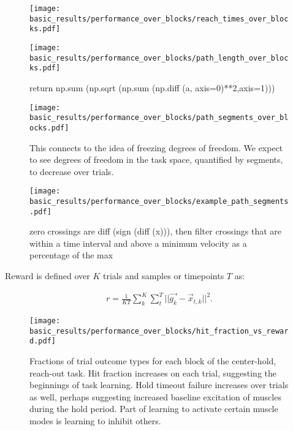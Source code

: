 \documentclass[../main.tex]{subfiles}
\begin{document}
\begin{figure}[H]
    \centering
    \texttt{[image: basic\_results/performance\_over\_blocks/reach\_times\_over\_blocks.pdf]}
    \caption[Reach time over trials]{}\label{fig:reach_times_over_blocks}
\end{figure}


\begin{figure}[H]
    \centering
    \texttt{[image: basic\_results/performance\_over\_blocks/path\_length\_over\_blocks.pdf]}
    \caption[Trajectory length over trials]{return np.sum (np.sqrt (np.sum (np.diff (a, axis=0)**2,axis=1)))}\label{fig:path_length_over_blocks}
\end{figure}


\begin{figure}[H]
    \centering
    \texttt{[image: basic\_results/performance\_over\_blocks/path\_segments\_over\_blocks.pdf]}
    \caption[Trajectory segments over trials]{This connects to the idea of freezing degrees of freedom. We expect to see degrees of freedom in the task space, quantified by segments, to decrease over trials.}\label{fig:path_segments_over_blocks}
\end{figure}


\begin{figure}[H]
    \centering
    \texttt{[image: basic\_results/performance\_over\_blocks/example\_path\_segments.pdf]}
    \caption[Trajectory segment definition]{zero crossings are diff (sign (diff (x))), then filter crossings that are within a time interval and above a minimum velocity as a percentage of the max}\label{fig:segments}
\end{figure}


Reward is defined over $K$ trials and samples or timepoints $T$ as:

\begin{align}
    r = \frac{1}{KT}\sum_k^K\sum_t^T{|| \vec{g_k} - \vec{x}_{t,k} ||^2}.
    \label{eq:reward}
\end{align}

\begin{figure}[H]
    \centering
    \texttt{[image: basic\_results/performance\_over\_blocks/hit\_fraction\_vs\_reward.pdf]}
    \caption[Hits versus reward]{Fractions of trial outcome types for each block of the center-hold, reach-out task. Hit fraction increases on each trial, suggesting the beginnings of task learning. Hold timeout failure increases over trials as well, perhaps suggesting increased baseline excitation of muscles during the hold period. Part of learning to activate certain muscle modes is learning to inhibit others.}\label{fig:hit_fraction_vs_reward}
\end{figure}
\end{document}
